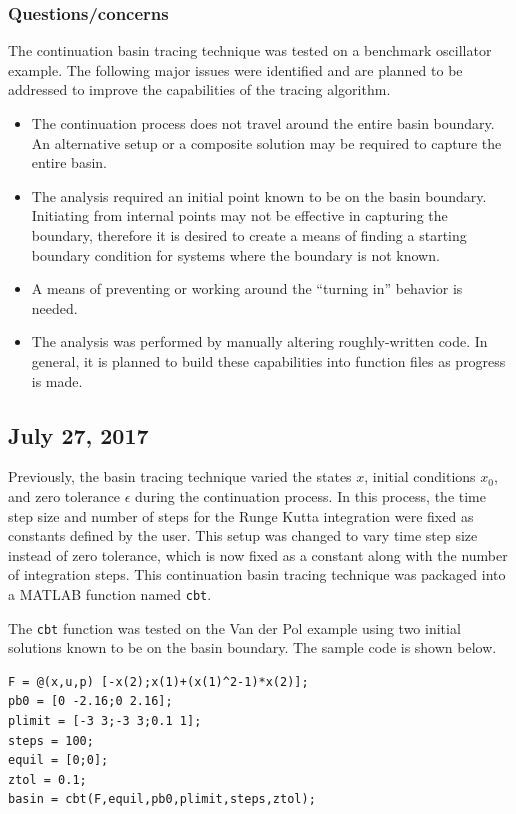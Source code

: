 \documentclass[12pt]{article}
\begin{document}
\subsubsection{Questions/concerns}
The continuation basin tracing technique was tested on a benchmark oscillator example. The following major issues were identified and are planned to be addressed to improve the capabilities of the tracing algorithm.

\begin{itemize}
\item The continuation process does not travel around the entire basin boundary. An alternative setup or a composite solution may be required to capture the entire basin.
\item The analysis required an initial point known to be on the basin boundary. Initiating from internal points may not be effective in capturing the boundary, therefore it is desired to create a means of finding a starting boundary condition for systems where the boundary is not known.
\item A means of preventing or working around the ``turning in'' behavior is needed.
\item The analysis was performed by manually altering roughly-written code. In general, it is planned to build these capabilities into function files as progress is made.
\end{itemize}


\subsection{July 27, 2017}
Previously, the basin tracing technique varied the states $x$, initial conditions $x_0$, and zero tolerance $\epsilon$ during the continuation process. In this process, the time step size and number of steps for the Runge Kutta integration were fixed as constants defined by the user. This setup was  changed to vary time step size instead of zero tolerance, which is now fixed as a constant along with the number of integration steps. This continuation basin tracing technique was packaged into a MATLAB function named \texttt{cbt}.

The \texttt{cbt} function was tested on the Van der Pol example using two initial solutions known to be on the basin boundary. The sample code is shown below. 

\begin{addmargin}[0.5in]{1em}
\begin{lstlisting}
F = @(x,u,p) [-x(2);x(1)+(x(1)^2-1)*x(2)];
pb0 = [0 -2.16;0 2.16];       
plimit = [-3 3;-3 3;0.1 1];     
steps = 100;                   
equil = [0;0];                  
ztol = 0.1;              
basin = cbt(F,equil,pb0,plimit,steps,ztol);
\end{lstlisting}
\end{addmargin}
\end{document}
